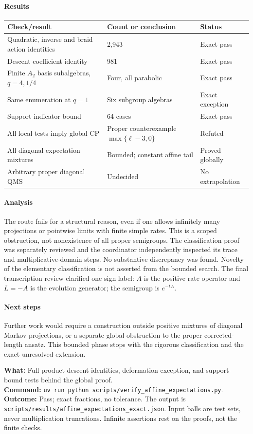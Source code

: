 \paragraph{Results}
{\setlength{\tabcolsep}{8pt}\renewcommand{\arraystretch}{1.2}
\begin{tabular}{lll}\toprule
Check/result & Count or conclusion & Status\\\midrule
Quadratic, inverse and braid action identities & 2,943 & Exact pass\\
Descent coefficient identity & 981 & Exact pass\\
Finite $A_2$ basis subalgebras, $q=4,1/4$ & Four, all parabolic & Exact pass\\
Same enumeration at $q=1$ & Six subgroup algebras & Exact exception\\
Support indicator bound & 64 cases & Exact pass\\
All local tests imply global CP & Proper counterexample $\max\{\ell-3,0\}$ & Refuted\\
All diagonal expectation mixtures & Bounded; constant affine tail & Proved globally\\
Arbitrary proper diagonal QMS & Undecided & No extrapolation\\\bottomrule
\end{tabular}}
\paragraph{Analysis} The route fails for a structural reason, even if one
allows infinitely many projections or pointwise limits with finite simple
rates. This is a scoped obstruction, not nonexistence of all proper
semigroups. The classification proof was separately reviewed and the
coordinator independently inspected its trace and multiplicative-domain
steps. No substantive discrepancy was found. Novelty of the elementary
classification is not asserted from the bounded search. The final
transcription review clarified one sign label: $A$ is the positive rate
operator and $L=-A$ is the evolution generator; the semigroup is $e^{-tA}$.
\paragraph{Next steps} Further work would require a construction outside
positive mixtures of diagonal Markov projections, or a separate global
obstruction to the proper corrected-length ansatz. This bounded phase
stops with the rigorous classification and the exact unresolved extension.
\begin{verification}
\textbf{What:} Full-product descent identities, deformation exception,
and support-bound tests behind the global proof.\\
\textbf{Command:} \texttt{uv run python scripts/verify\_affine\_expectations.py}.\\
\textbf{Outcome:} Pass; exact fractions, no tolerance. The output is
\texttt{scripts/results/affine\_expectations\_exact.json}. Input balls
are test sets, never multiplication truncations. Infinite assertions
rest on the proofs, not the finite checks.
\end{verification}

